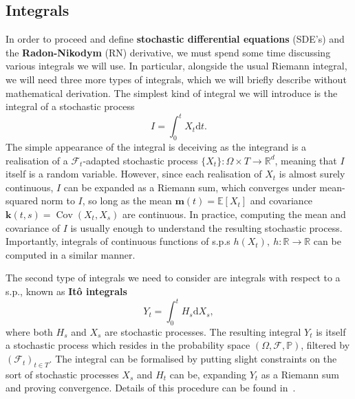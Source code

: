 \subsection{Integrals}
In order to proceed and define \textbf{stochastic differential equations} (SDE's) and the \textbf{Radon-Nikodym} (RN) derivative, we must spend some time discussing various integrals we will use. In particular, alongside the usual Riemann integral, we will need three more types of integrals, which we will briefly describe without mathematical derivation. The simplest kind of integral we will introduce is the integral of a stochastic process
\begin{equation}
	I = \int_{0}^{t} X_t \mathrm{d}t.
\end{equation}
The simple appearance of the integral is deceiving as the integrand is a realisation of a $\mathcal{F}_t$-adapted stochastic process $\{X_t\}: \Omega \times T \rightarrow \mathbb{R}^{d}$, meaning that $I$ itself is a random variable. However, since each realisation of $X_t$ is almost surely continuous, $I$ can be expanded as a Riemann sum, which converges under mean-squared norm to $I$, so long as the mean $\mathbf{m}(t) = \mathbb{E}[X_t]$ and covariance $\textbf{k}(t,s) = \operatorname{Cov}(X_t, X_s)$ are continuous. In practice, computing the mean and covariance of $I$ is usually enough to understand the resulting stochastic process. Importantly, integrals of continuous functions of s.p.s $h(X_t),~ h: \mathbb{R} \rightarrow \mathbb{R}$ can be computed in a similar manner.

The second type of integrals we need to consider are integrals with respect to a s.p., known as \textbf{It\^ o integrals}
\begin{equation}
	\label{eq:ito}
	Y_t = \int_{0}^{t} H_s \mathrm{d}X_s,
\end{equation}
where both $H_s$ and $X_s$ are stochastic processes. The resulting integral $Y_t$ is itself a stochastic process which resides in the probability space $(\Omega, \mathcal{F}, \mathbb{P})$, filtered by $\left(\mathcal{F}_t\right)_{t\in T}$. The integral can be formalised by putting slight constraints on the sort of stochastic processes $X_s$ and $H_t$ can be, expanding $Y_t$ as a Riemann sum and proving convergence. Details of this procedure can be found in~\cite{rogers2000diffusions}.


